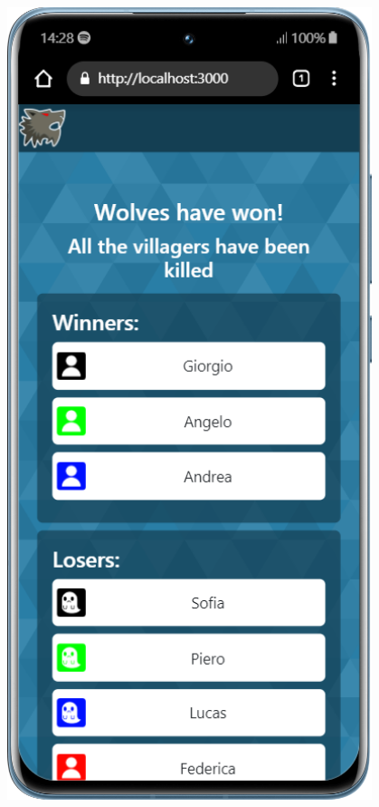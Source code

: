 \begin{figure}[H]
    \centering
    \begin{minipage}{0.25\textwidth}
        \centering
        \includegraphics[width=0.95\textwidth]{img/screen/mobile/won_mobile.png}

\end{minipage}
\end{figure}
